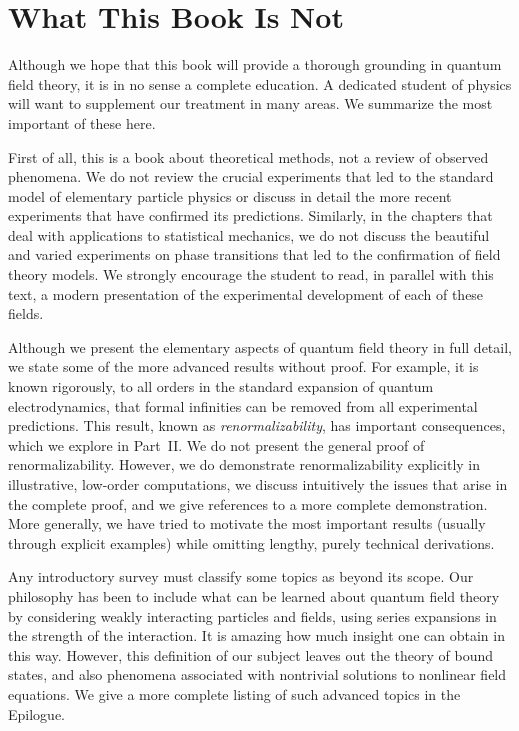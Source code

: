 \section*{What This Book Is Not}

Although we hope that this book will provide a thorough grounding in
quantum field theory, it is in no sense a complete education.  A dedicated
student of physics will want to supplement our treatment in many areas.
We summarize the most important of these here.

First of all, this is a book about theoretical methods, not a review of
observed phenomena.  We do not review the crucial experiments that led to
the standard model of elementary particle physics or discuss in detail
the more recent experiments that have confirmed its predictions.  Similarly,
in the chapters that deal with applications to statistical mechanics, we
do not discuss the beautiful and varied experiments on phase transitions
that led to the confirmation of field theory models.  We strongly encourage
the student to read, in parallel with this text, a modern presentation of
the experimental development of each of these fields.

Although we present the elementary aspects of quantum field theory in full
detail, we state some of the more advanced results without proof.  For
example, it is known rigorously, to all orders in the standard expansion
of quantum electrodynamics, that formal infinities can be removed from all
experimental predictions.  This result, known as \emph{renormalizability},
has important consequences, which we explore in Part~II.  We do not present
the general proof of renormalizability.  However, we do demonstrate
renormalizability explicitly in illustrative, low-order computations, we
discuss intuitively the issues that arise in the complete proof, and we
give references to a more complete demonstration.  More generally, we have
tried to motivate the most important results (usually through explicit
examples) while omitting lengthy, purely technical derivations.

Any introductory survey must classify some topics as beyond its scope.
Our philosophy has been to include what can be learned about quantum field
theory by considering weakly interacting particles and fields, using
series expansions in the strength of the interaction.  It is amazing how
much insight one can obtain in this way.  However, this definition of our
subject leaves out the theory of bound states, and also phenomena
associated with nontrivial solutions to nonlinear field equations.  We give
a more complete listing of such advanced topics in the Epilogue.

